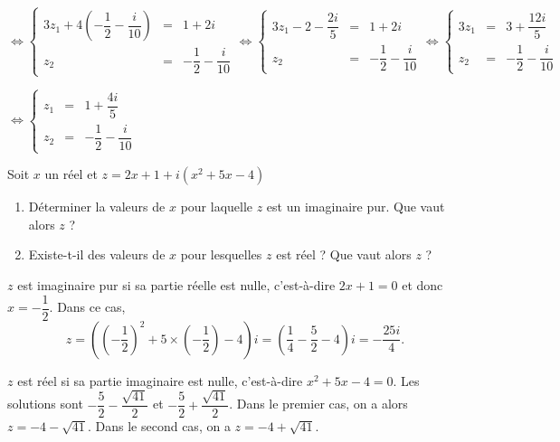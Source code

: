 \documentclass[11pt,fleqn, openany]{book} %
\begin{document}
\begin{solution}
\(\Leftrightarrow \left\{\begin{array}{rcl}
3z_1+4\left(-\dfrac{1}{2}-\dfrac{i}{10}\right) &=& 1+2i\\
z_2 &=&-\dfrac{1}{2}-\dfrac{i}{10} \end{array}\right.\Leftrightarrow \left\{\begin{array}{rcl}
3z_1-2-\dfrac{2i}{5} &=& 1+2i\\
z_2 &=&-\dfrac{1}{2}-\dfrac{i}{10} \end{array}\right.\Leftrightarrow \left\{\begin{array}{rcl}
3z_1 &=& 3+\dfrac{12i}{5}\\
z_2 &=&-\dfrac{1}{2}-\dfrac{i}{10} \end{array}\right.\)

\(\Leftrightarrow \left\{\begin{array}{rcl}
z_1 &=& 1+\dfrac{4i}{5}\\
z_2 &=&-\dfrac{1}{2}-\dfrac{i}{10} \end{array}\right.\)

\end{solution}


\begin{exercise}[topic=cpx01]Soit $x$ un réel et $z=2x+1+i(x^2+5x-4)$
\begin{enumerate}
\item Déterminer la valeurs de $x$ pour laquelle $z$ est un imaginaire pur. Que vaut alors $z$ ?
\item Existe-t-il des valeurs de $x$ pour lesquelles $z$ est réel ? Que vaut alors $z$ ?

\end{enumerate}\end{exercise}

\begin{solution}
\(z\) est imaginaire pur si sa partie réelle est nulle, c'est-à-dire \(2x+1=0\) et donc \(x=-\dfrac{1}{2}\). Dans ce cas,
\[z=\left( \left(-\dfrac{1}{2}\right)^2+5\times \left(-\dfrac{1}{2}\right)-4\right)i=\left(\dfrac{1}{4}-\dfrac{5}{2}-4\right)i=-\dfrac{25i}{4}.\]

\(z\) est réel si sa partie imaginaire est nulle, c'est-à-dire \(x^2+5x-4=0\). Les solutions sont \(-\dfrac{5}{2}-\dfrac{\sqrt{41}}{2}\) et \(-\dfrac{5}{2}+\dfrac{\sqrt{41}}{2}\). Dans le premier cas, on a alors \(z=-4-\sqrt{41}\). Dans le second cas, on a \(z=-4+\sqrt{41}\).

\end{solution}
\end{document}

